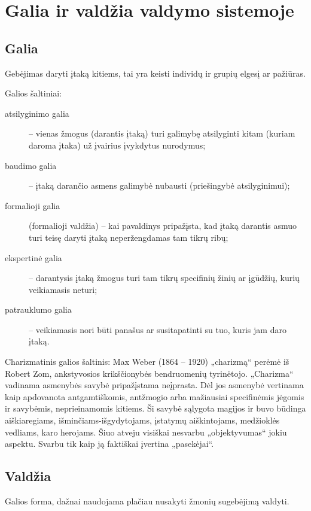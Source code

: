 \chapter{Galia ir valdžia valdymo sistemoje}

\section{Galia}

\begin{defn}[Galia]
  Gebėjimas daryti įtaką kitiems, tai yra keisti individų ir grupių
  elgesį ar pažiūras.
\end{defn}

Galios šaltiniai:
\begin{description}
  \item[atsilyginimo galia] – vienas žmogus (darantis įtaką) turi
    galimybę atsilyginti kitam (kuriam daroma įtaka) už įvairius
    įvykdytus nurodymus;
  \item[baudimo galia] – įtaką darančio asmens galimybė nubausti
    (priešingybė atsilyginimui);
  \item[formalioji galia] (formalioji valdžia) – kai pavaldinys
    pripažįsta, kad įtaką darantis asmuo turi teisę daryti įtaką
    neperžengdamas tam tikrų ribų;
  \item[ekspertinė galia] – darantysis įtaką žmogus turi tam tikrų
    specifinių žinių ar įgūdžių, kurių veikiamasis neturi;
  \item[patrauklumo galia] – veikiamasis nori būti panašus ar
    susitapatinti su tuo, kuris jam daro įtaką.
\end{description}

Charizmatinis galios šaltinis: Max Weber (1864 – 1920) „charizmą“ perėmė
iš Robert Zom, ankstyvosios krikščionybės bendruomenių tyrinėtojo.
„Charizma“ vadinama asmenybės savybė pripažįstama neįprasta.
Dėl jos asmenybė vertinama kaip apdovanota antgamtiškomis, antžmogio
arba mažiausiai specifinėmis jėgomis ir savybėmis, neprieinamomis
kitiems. Ši savybė sąlygota magijos ir buvo būdinga aiškiaregiams,
išminčiams-išgydytojams, įstatymų aiškintojams, medžioklės vedliams,
karo herojams. Šiuo atveju visiškai nesvarbu „objektyvumas“ jokiu
aspektu. Svarbu tik kaip ją faktiškai įvertina „pasekėjai“.

\section{Valdžia}

\begin{defn}[Valdžia]
  Galios forma, dažnai naudojama plačiau nusakyti žmonių sugebėjimą
  valdyti.
\end{defn}

